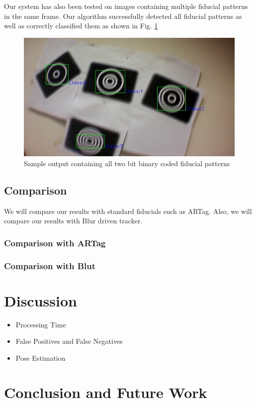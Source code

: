 \documentclass[runningheads]{llncs}
\begin{document}
Our system has also been tested on images containing multiple fiducial patterns
in the same frame. Our algorithm successfully detected all fiducial patterns as
well as correctly classified them as shown in Fig. \ref{fig:output_all}
\begin{figure}
\centering
  \includegraphics[width=.8\linewidth]{output_all_2.jpg}
  \caption{Sample output containing all two bit binary coded fiducial patterns}
  \label{fig:output_all}
\end{figure}

\subsection{Comparison}
We will compare our results with standard fiducials such as ARTag. Also, we will
compare our results with Blur driven tracker.
\subsubsection{Comparison with ARTag}
\subsubsection{Comparison with Blut} 

\section{Discussion}
\begin{itemize}
\item Processing Time
\item False Positives and False Negatives
\item Pose Estimation
\end{itemize}
\section{Conclusion and Future Work}



\end{document}
